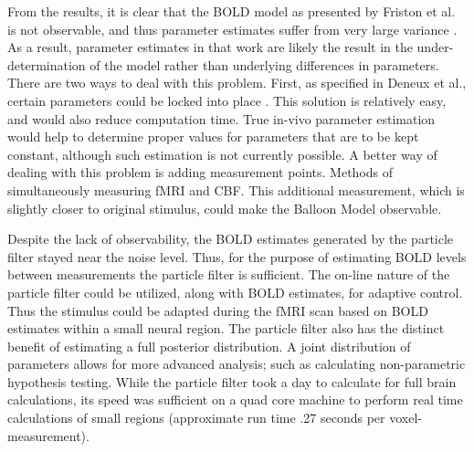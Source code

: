 \documentclass{article}
\begin{document}
From the results, it is clear that the BOLD model as presented
by Friston et al. is not observable, and thus parameter estimates
suffer from very large variance \cite{Friston2000}. As a result, parameter estimates
in that work are likely the result in the under-determination of
the model rather than underlying differences in parameters. 
There are two ways to deal with this problem. First, as
specified in Deneux et al., certain parameters could be locked into
place \cite{Deneux2006}. This solution is relatively easy, and would
also reduce computation time. True in-vivo parameter estimation
would help to determine proper values for parameters that are to be
kept constant, although such estimation is not currently possible. 
A better way of dealing with this problem is adding measurement
points. Methods of simultaneously measuring fMRI and \ac{CBF}. 
This additional measurement, which is slightly closer to 
original stimulus, could make the Balloon Model observable.

Despite the lack of observability, the BOLD estimates generated 
by the particle filter stayed near the noise level. 
Thus, for the purpose of estimating BOLD levels between measurements
the particle filter is sufficient. The on-line nature of the
particle filter could be utilized, along with BOLD estimates,
for adaptive control. Thus the stimulus could be
adapted during the fMRI scan based on BOLD estimates within a small neural
region. The particle filter also has the distinct benefit of 
estimating a full posterior distribution. A joint distribution of 
parameters allows for more advanced analysis; such as calculating
non-parametric hypothesis testing.  
While the particle filter took a day to calculate for full brain calculations, its speed
was sufficient on a quad core machine to perform real time calculations of small regions
(approximate run time .27 seconds per voxel-measurement). 

\small


\end{document}
